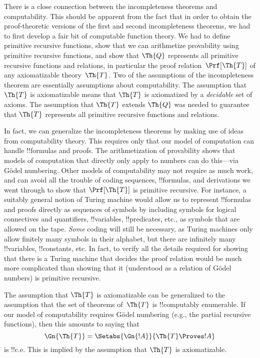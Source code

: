 \documentclass[../../../include/open-logic-section]{subfiles}
\begin{document}

There is a close connection between the incompleteness theorems and
computability. This should be apparent from the fact that in order to
obtain the proof-theoretic versions of the first and second
incompleteness theorems, we had to first develop a fair bit of
computable function theory. We had to define primitive recursive
functions, show that we can arithmetize provability using primitive
recursive functions, and show that $\Th{Q}$ represents all primitive
recursive functions and relations, in particular the proof
relation~$\Prf[\Th{T}]$ of any axiomatizable theory~$\Th{T}$. Two of the
assumptions of the incompleteness theorem are essentially assumptions
about computability. The assumption that $\Th{T}$ is axiomatizable
means that $\Th{T}$ is axiomatized by a \emph{decidable} set of
axioms. The assumption that $\Th{T}$ extends $\Th{Q}$ was needed to
guarantee that $\Th{T}$ represents all primitive recursive functions
and relations.

In fact, we can generalize the incompleteness theorems by making use
of ideas from computability theory. This requires only that our model
of computation can handle !!{formula}s and proofs. The arithmetization of
provability shows that models of computation that directly only apply
to numbers can do this---via G\"odel numbering. Other models of
computability may not require as much work, and can avoid all the
trouble of coding sequences, !!{formula}s, and derivations we went through
to show that $\Prf[\Th{T}]$ is primitive recursive. For instance, a
suitably general notion of Turing machine would allow us to represent
!!{formula}s and proofs directly as sequences of symbols by including
symbols for logical connectives and quantifiers, !!{variable}s,
!!{predicate}s, etc., as symbols that are allowed on the tape.
\emph{Some} coding will still be necessary, as Turing machines only
allow finitely many symbols in their alphabet, but there are
infinitely many !!{variable}s, !!{constant}s, etc. In fact, to verify
all the details required for showing that there is a Turing machine
that decides the proof relation would be much more complicated than
showing that it (understood as a relation of G\"odel numbers) is
primitive recursive.

The assumption that $\Th{T}$ is axiomatizable can be generalized to
the assumption that the set of theorems of~$\Th{T}$ is !!{computably
enumerable}. If our model of computability requires G\"odel numbering
(e.g., the partial recursive functions), then this amounts to saying
that 
\[
  \Gn{\Th{T}} = \Setabs{\Gn{!A}}{\Th{T} \Proves !A}
\]
is !!{c.e.} This is implied by the assumption that $\Th{T}$ is
axiomatizable.
\end{document}
